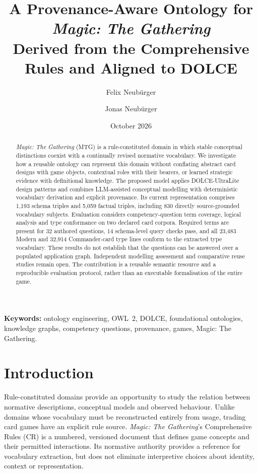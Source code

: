 \documentclass[11pt,a4paper]{article}
\title{\bfseries A Provenance-Aware Ontology for \emph{Magic: The Gathering}\\[2pt]
       \large Derived from the Comprehensive Rules and Aligned to DOLCE}
\author[1]{Felix Neub\"urger}
\author[1]{Jonas Neub\"urger}
\affil[1]{Independent Research \\ \texttt{github.com/cuteredpwnda/opposition-agents-playing-mtg}}
\date{October 2026}
\begin{document}
\maketitle

\begin{abstract}
\noindent
\emph{Magic: The Gathering} (MTG) is a rule-constituted domain in which stable conceptual distinctions coexist with a continually revised normative vocabulary. We investigate how a reusable ontology can represent this domain without conflating abstract card designs with game objects, contextual roles with their bearers, or learned strategic evidence with definitional knowledge. The proposed model applies DOLCE-UltraLite design patterns and combines LLM-assisted conceptual modelling with deterministic vocabulary derivation and explicit provenance. Its current representation comprises 1{,}193 schema triples and 5{,}059 factual triples, including 830 directly source-grounded vocabulary subjects. Evaluation considers competency-question term coverage, logical analysis and type conformance on two declared card corpora. Required terms are present for 32 authored questions, 14 schema-level query checks pass, and all 23{,}483 Modern and 32{,}914 Commander-card type lines conform to the extracted type vocabulary. These results do not establish that the questions can be answered over a populated application graph. Independent modelling assessment and comparative reuse studies remain open. The contribution is a reusable semantic resource and a reproducible evaluation protocol, rather than an executable formalisation of the entire game.
\end{abstract}

\vspace{0.5em}
\noindent\textbf{Keywords:} ontology engineering, OWL~2, DOLCE, foundational ontologies, knowledge graphs, competency questions, provenance, games, Magic: The Gathering.

\section{Introduction}
\label{sec:intro}

Rule-constituted domains provide an opportunity to study the relation between normative descriptions, conceptual models and observed behaviour. Unlike domains whose vocabulary must be reconstructed entirely from usage, trading card games have an explicit rule source. \emph{Magic: The Gathering}'s Comprehensive Rules (CR) is a numbered, versioned document that defines game concepts and their permitted interactions. Its normative authority provides a reference for vocabulary extraction, but does not eliminate interpretive choices about identity, context or representation.
\end{document}
